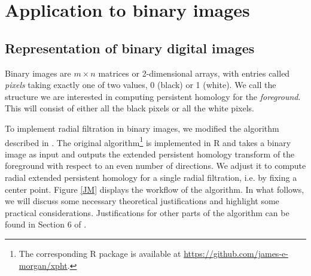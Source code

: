 \documentclass[a4paper,11pt]{article}
\theoremstyle{definition}
\begin{document}
\section{Application to binary images}
\label{application}

\subsection{Representation of binary digital images}
\label{consider}

Binary images are $m\times n$ matrices or 2-dimensional arrays, with entries called \emph{pixels} taking exactly one of two values, 0 (black) or 1 (white). We call the structure we are interested in computing persistent homology for the \emph{foreground}.  This will consist of either all the black pixels or all the white pixels.  

To implement radial filtration in binary images, we modified the algorithm described in \cite{KT2022}. The original algorithm\footnote{The corresponding R package is available at \url{https://github.com/james-e-morgan/xpht}.} 
is implemented in R and takes a binary image as input and outputs the extended persistent homology transform of the foreground with respect to an even number of directions. 
We adjust it to compute radial extended persistent homology for a single radial filtration, i.e. by fixing a center point. Figure \ref{JM} displays the workflow of the algorithm. In what follows, we will discuss some necessary theoretical justifications and highlight some practical considerations. Justifications for other parts of the algorithm can be found in Section 6 of \cite{KT2022}. 
\end{document}
